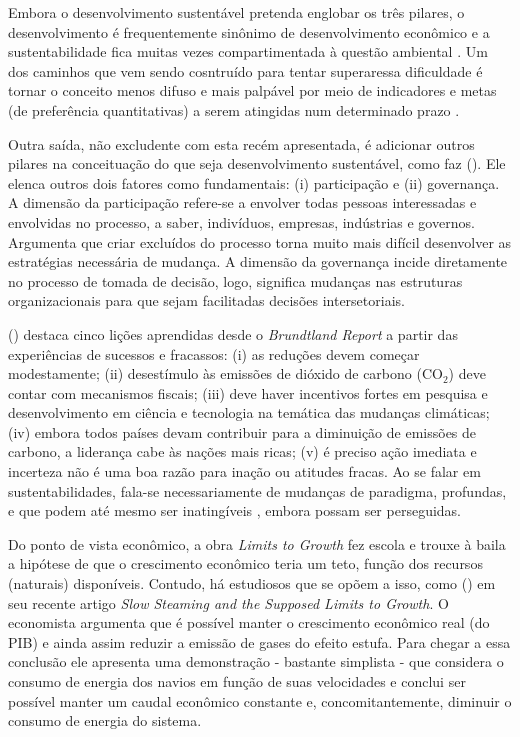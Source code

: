 Embora o desenvolvimento sustentável pretenda englobar os três pilares, o desenvolvimento é frequentemente sinônimo de desenvolvimento econômico e a sustentabilidade fica muitas vezes compartimentada à questão ambiental \cite{ONU2010}. Um dos caminhos que vem sendo cosntruído para tentar superaressa dificuldade é tornar o conceito menos difuso e mais palpável por meio de indicadores \cite{CHAMBERS2000,BOULANGER2008,BARRETT2010,FORTES2012} e metas (de preferência quantitativas) a serem atingidas num determinado prazo \cite{ONU2010,ONU2014}.

Outra saída, não excludente com esta recém apresentada, é adicionar outros pilares na conceituação do que seja desenvolvimento sustentável, como faz 
 (\citeyear{BANISTER2005}). Ele elenca outros dois fatores como fundamentais: (i) participação e (ii) governança. A dimensão da participação refere-se a envolver todas pessoas interessadas e envolvidas no processo, a saber, indivíduos, empresas, indústrias e governos. Argumenta que criar excluídos do processo torna muito mais difícil desenvolver as estratégias necessária de mudança. A dimensão da governança incide diretamente no processo de tomada de decisão, logo, significa mudanças nas estruturas organizacionais para que sejam facilitadas decisões intersetoriais.

 (\citeyear{BANISTER2005}) destaca cinco lições aprendidas desde o \emph{Brundtland Report} a partir das experiências de sucessos e fracassos: (i) as reduções devem começar modestamente; (ii) desestímulo às emissões de dióxido de carbono (CO$_2$) deve contar com mecanismos fiscais; (iii) deve haver incentivos fortes em pesquisa e desenvolvimento em ciência e tecnologia na temática das mudanças climáticas; (iv) embora todos países devam contribuir para a diminuição de emissões de carbono, a liderança cabe às nações mais ricas; (v) é preciso ação imediata e incerteza não é uma boa razão para inação ou atitudes fracas.
Ao se falar em sustentabilidades, fala-se necessariamente de mudanças de paradigma, profundas, e que podem até mesmo ser inatingíveis \cite{GLASBY2002}, embora possam ser perseguidas.

Do ponto de vista econômico, a obra \emph{Limits to Growth} fez escola e trouxe à baila a hipótese de que o crescimento econômico teria um teto, função dos recursos (naturais) disponíveis. Contudo, há estudiosos que se opõem a isso, como  (\citeyear{KRUGMAN2014}) em seu recente artigo \emph{Slow Steaming and the Supposed Limits to Growth}. O economista argumenta que é possível manter o crescimento econômico real (do PIB) e ainda assim reduzir a emissão de gases do efeito estufa. Para chegar a essa conclusão ele apresenta uma demonstração - bastante simplista - que considera o consumo de energia dos navios em função de suas velocidades e conclui ser possível manter um caudal econômico constante e, concomitantemente, diminuir o consumo de energia do sistema.

